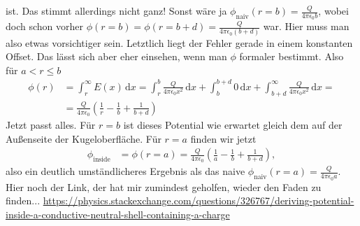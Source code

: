 \documentclass[english, parskip=full]{scrartcl}
\begin{document}
ist. Das stimmt allerdings nicht ganz! Sonst wäre ja $\phi_\mathrm{naiv}(r=b)=\frac{Q}{4\pi\epsilon_0 b}$, wobei doch schon vorher $\phi(r=b)=\phi(r=b+d)=\frac{Q}{4\pi\epsilon_0 (b+d)}$ war.
Hier muss man also etwas vorsichtiger sein. Letztlich liegt der Fehler gerade in einem konstanten Offset. Das lässt sich aber eher einsehen, wenn man $\phi$ formaler bestimmt. Also für $a<r\le b$
\begin{align}
\phi(r)&=\int_r^\infty E(x)\,\mathrm{d}x=\int_r^b \frac{Q}{4\pi\epsilon_0x^2}\,\mathrm{d}x+\int_b^{b+d}0\,\mathrm{d}x+\int_{b+d}^\infty \frac{Q}{4\pi\epsilon_0 x^2}\,\mathrm{d}x=\\
&=\frac{Q}{4\pi\epsilon_0}\left( \frac{1}{r}-\frac{1}{b}+\frac{1}{b+d} \right)
\end{align}
Jetzt passt alles. Für $r=b$ ist dieses Potential wie erwartet gleich dem auf der Außenseite der Kugeloberfläche.
Für $r=a$ finden wir jetzt 
\begin{align}
\phi_\mathrm{inside}&=\phi(r=a)=\frac{Q}{4\pi\epsilon_0}\left( \frac{1}{a}-\frac{1}{b}+\frac{1}{b+d} \right),
\end{align}
also ein deutlich umständlicheres Ergebnis als das naive $\phi_\mathrm{naiv}(r=a)=\frac{Q}{4\pi\epsilon_0a}$.
\\
Hier noch der Link, der hat mir zumindest geholfen, wieder den Faden zu finden...
\url{https://physics.stackexchange.com/questions/326767/deriving-potential-inside-a-conductive-neutral-shell-containing-a-charge}

\end{document}
